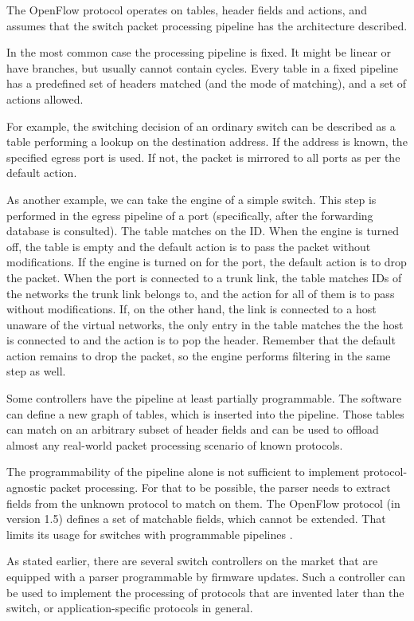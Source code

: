 The OpenFlow protocol operates on tables, header fields and actions, and
assumes that the switch packet
processing pipeline has the architecture described.

In the most common case the processing pipeline is fixed. It might be
linear or have branches, but usually cannot contain cycles. Every table in
a fixed pipeline has a predefined set of headers matched (and the mode of
matching), and a set of actions allowed.

For example, the switching decision of an ordinary switch can be described as a table
performing a lookup on the destination  address. If the address is known,
the specified egress port is used. If not, the packet is mirrored to all
ports as per the default action.

As another example, we can take the  engine of a simple switch. This step
is performed in the egress pipeline of a port (specifically, after the forwarding database
is consulted). The table matches on the  ID. When the engine is turned
off, the table is empty and the default action is to pass the packet without
modifications. If the engine is turned on for the port, the default action is
to drop the packet. When the port is connected to a trunk link, the table matches
 IDs of the networks the trunk link belongs to, and the action for
all of them is to pass without modifications. If, on the other hand, the link is
connected to a host unaware of the virtual networks, the only entry in the table
matches the  the host is connected to and the action is to pop the 
header. Remember that the default action remains to drop the packet, so the
engine performs filtering in the same step as well.

Some controllers have the pipeline at least partially programmable.
The software can define a new graph of tables, which is inserted into the
pipeline. Those tables can match on an arbitrary subset of header fields and can be
used to offload almost any real-world packet processing scenario of known
protocols.

The programmability of the pipeline alone is not sufficient to implement
protocol-agnostic packet processing. For that to be possible, the parser needs
to extract fields from the unknown protocol to match on them. The OpenFlow
protocol (in version 1.5) defines a set of matchable fields, which
cannot be extended. That limits its usage for switches with programmable
pipelines \cite{openflow}.

As stated earlier, there are several switch controllers on the market that are
equipped with a parser programmable by firmware updates. Such a controller can be
used to implement the processing of protocols that are invented later than the
switch, or application-specific protocols in general.

